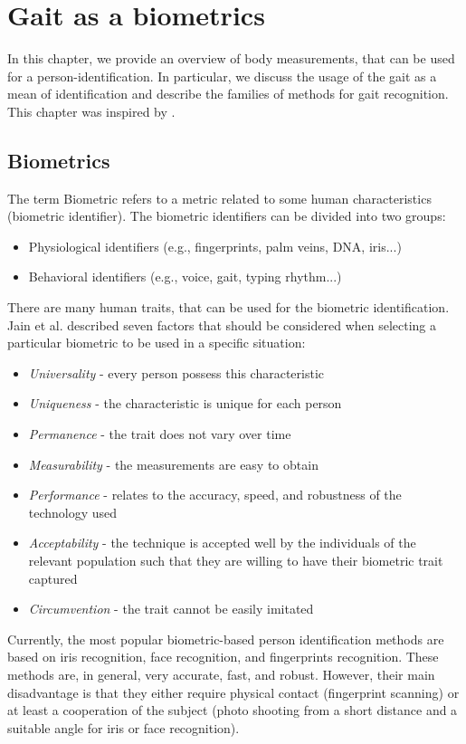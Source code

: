 \chapter{Gait as a biometrics} \label{ch:gait_recognition}
In this chapter, we provide an overview of body measurements, that can be used for a person-identification. In particular, we discuss the usage of the gait as a mean of identification and describe the families of methods for gait recognition. This chapter was inspired by \cite{gafurov2007survey}.
 
\section{Biometrics}
The term Biometric refers to a metric related to some human characteristics (biometric identifier). The biometric identifiers can be divided into two groups:
\begin{itemize}
    \item Physiological identifiers (e.g., fingerprints, palm veins, DNA, iris...)
    \item Behavioral identifiers (e.g., voice, gait, typing rhythm...)
\end{itemize}
\bigbreak
There are many human traits, that can be used for the biometric identification. Jain et al. \cite{biometrics} described seven factors that should be considered when selecting a particular biometric to be used in a specific situation:
\begin{itemize}
    \item \textit{Universality} - every person possess this characteristic
    \item \textit{Uniqueness} - the characteristic is unique for each person
    \item \textit{Permanence} - the trait does not vary over time
    \item \textit{Measurability} - the measurements are easy to obtain
    \item \textit{Performance} - relates to the accuracy, speed, and robustness of the technology used 
    \item \textit{Acceptability} - the technique is accepted well by the individuals of the relevant population such that they are willing to have their biometric trait captured
    \item \textit{Circumvention} - the trait cannot be easily imitated
\end{itemize}
\bigbreak
Currently, the most popular biometric-based person identification methods are based on iris recognition, face recognition, and fingerprints recognition. These methods are, in general, very accurate, fast, and robust. However, their main disadvantage is that they either require physical contact (fingerprint scanning) or at least a cooperation of the subject (photo shooting from a short distance and a suitable angle for iris or face recognition). 

